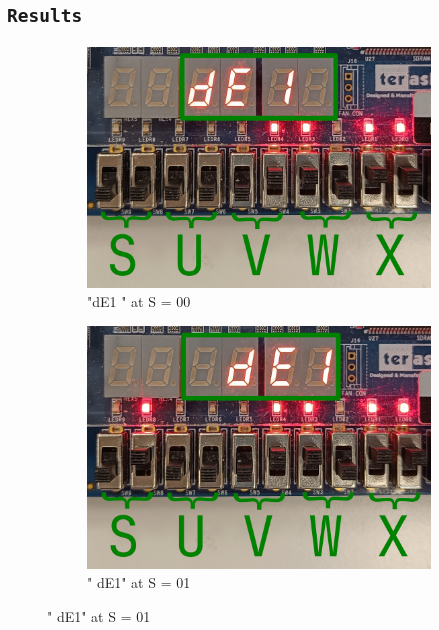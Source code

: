 \documentclass{article}
\let\oldsubsection\subsection
\renewcommand{\subsection}[1]{%
  \oldsubsection{\texttt{#1}}%
  \setcounter{subsubsection}{-1}%
}
\begin{document}
\subsection{Results}
\begin{figure}[h]
    \centering
    \begin{subfigure}{0.45\textwidth}
        \centering
        \includegraphics[width=1\textwidth]{Figures/Part5_dE1_00.png}
        \caption{"dE1 " at S = 00}
        \label{fig:T05de1pic1}
    \end{subfigure}
    \hfill
    \begin{subfigure}{0.45\textwidth}
        \centering
        \includegraphics[width=1\textwidth]{Figures/Part5_dE1_01.png}
        \caption{" dE1" at S = 01}
        \label{fig:T05de1pic2}
    \end{subfigure}

\end{figure}
\end{document}
